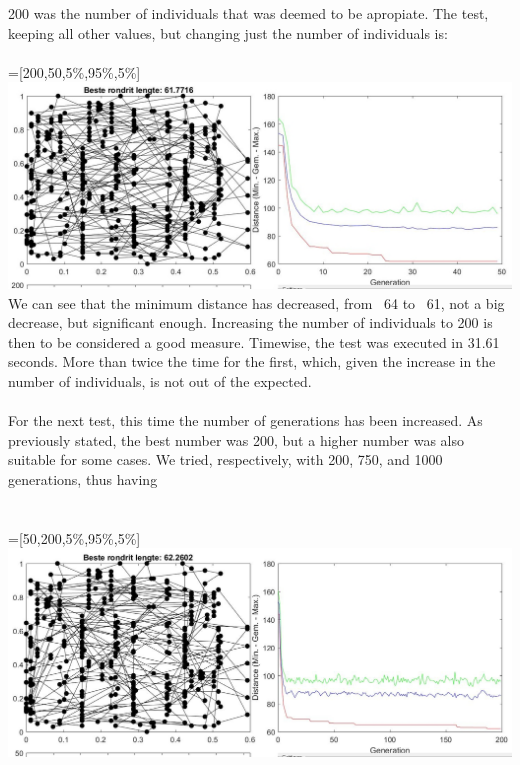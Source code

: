 200 was the number of individuals that was deemed to be apropiate. 
The test, keeping all other values, but changing just the number of
individuals is:
\\
\\
 =[200,50,5\%,95\%,5\%] \\
\includegraphics[width=\textwidth]{img/specific/xalt_edges/general_2.jpg}\\
We can see that the minimum distance has decreased, from ~64 to ~61, not a
big decrease, but significant enough. Increasing the number of
individuals to 200 is then to be considered a good measure. Timewise, the test was executed in 31.61 seconds. More than twice the time for the
first, which, given the increase in the number of individuals, is not out of
the expected. \\
\\
For the next test, this time the number of generations has been
increased. As previously stated, the best number was 200, but a higher number
was also suitable for some cases. We tried, respectively, with 200, 750, and
1000 generations, thus having\\
\\
\\
 =[50,200,5\%,95\%,5\%]\\
\includegraphics[width=\textwidth]{img/specific/xalt_edges/general_3.jpg}\\

